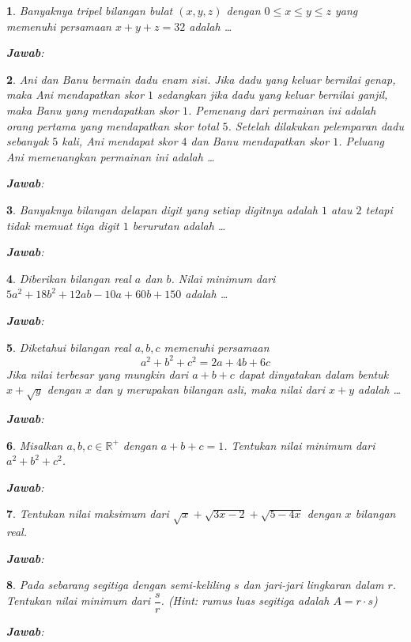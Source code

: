 \documentclass[11pt,a4paper,DIV=12]{scrartcl}
\newcommand\answerbox{%
\vspace*{0.5cm}%
\noindent\textbf{\textsf{Jawab}}: \fbox{\rule{14cm}{0pt}\rule[-0.2ex]{0pt}{1.9ex}}}
\theoremstyle{problemstyle}
\newtheorem{problem}{}
\theoremstyle{answerstyle}
\begin{document}
\begin{problem}
  Banyaknya tripel bilangan bulat $(x,y,z)$ dengan $0 \le x \le y \le z$ yang memenuhi persamaan $x + y + z = 32$ adalah \dots

  \answerbox
\end{problem}

\begin{problem}
  Ani dan Banu bermain dadu enam sisi. Jika dadu yang keluar bernilai genap, maka Ani mendapatkan skor $1$ sedangkan jika dadu yang keluar bernilai ganjil, maka Banu yang mendapatkan skor $1$. Pemenang dari permainan ini adalah orang pertama yang mendapatkan skor total $5$. Setelah dilakukan pelemparan dadu sebanyak $5$ kali, Ani mendapat skor $4$ dan Banu mendapatkan skor $1$. Peluang Ani memenangkan permainan ini adalah \dots

  \answerbox
\end{problem}

\begin{problem}
  Banyaknya bilangan delapan digit yang setiap digitnya adalah $1$ atau $2$ tetapi tidak memuat tiga digit $1$ berurutan adalah \dots

  \answerbox
\end{problem}

\begin{problem}
  Diberikan bilangan real $a$ dan $b$. Nilai minimum dari
  $
    5a^2 + 18b^2 + 12ab - 10a + 60b + 150
  $
  adalah \dots

  \answerbox
\end{problem}

\begin{problem}
  Diketahui bilangan real $a, b, c$ memenuhi persamaan
  \[
    a^2 + b^2 + c^2 = 2a + 4b + 6c
  \]
  Jika nilai terbesar yang mungkin dari $a + b + c$ dapat dinyatakan dalam bentuk $x + \sqrt{y}$ dengan $x$ dan $y$ merupakan bilangan asli, maka nilai dari $x + y$ adalah \dots

  \answerbox
\end{problem}

\begin{problem}
  Misalkan $a,b,c\in\mathbb{R}^+$ dengan $a+b+c=1$. Tentukan nilai minimum dari
  $
    a^2+b^2+c^2
  $.

  \answerbox
\end{problem}

\begin{problem}
  Tentukan nilai maksimum dari
  $
    \sqrt{x}+\sqrt{3x-2}+\sqrt{5-4x}
  $
  dengan $x$ bilangan real.

  \answerbox
\end{problem}

\begin{problem}
  Pada sebarang segitiga dengan semi-keliling $s$ dan jari-jari lingkaran dalam $r$. Tentukan nilai minimum dari $\dfrac{s}{r}$.
  \textit{(Hint: rumus luas segitiga adalah $A = r \cdot s$)}

  \answerbox
\end{problem}
\end{document}
